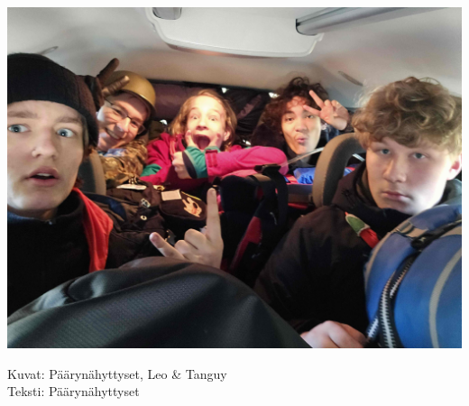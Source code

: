 \begin{multicols}{2}
\bigskip

\noindent\includegraphics[width=1.0\linewidth]{assets/telttaretki2}

\end{multicols}

\bigskip
\noindent\null\hfill Kuvat: Päärynähyttyset, Leo \& Tanguy\\
\noindent\null\hfill Teksti: Päärynähyttyset
